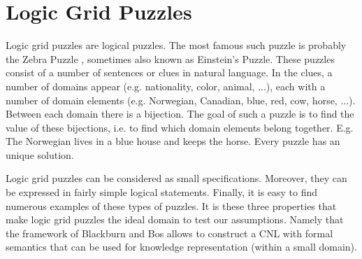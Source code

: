 \section{Logic Grid Puzzles}
Logic grid puzzles are logical puzzles. The most famous such puzzle is probably the Zebra Puzzle \cite{zebra}, sometimes also known as Einstein's Puzzle. These puzzles consist of a number of sentences or clues in natural language. In the clues, a number of domains appear (e.g. nationality, color, animal, ...), each with a number of domain elements (e.g. Norwegian, Canadian, blue, red, cow, horse, ...). Between each domain there is a bijection. The goal of such a puzzle is to find the value of these bijections, i.e. to find which domain elements belong together. E.g. The Norwegian lives in a blue house and keeps the horse. Every puzzle has an unique solution.
 
Logic grid puzzles can be considered as small specifications. Moreover, they can be expressed in fairly simple logical statements. Finally, it is easy to find numerous examples of these types of puzzles. It is these three properties that make logic grid puzzles the ideal domain to test our assumptions. Namely that the framework of Blackburn and Bos allows to construct a CNL with formal semantics that can be used for knowledge representation (within a small domain).
